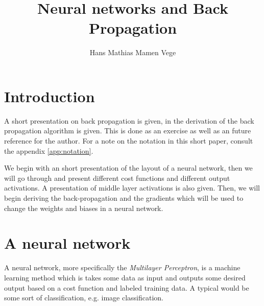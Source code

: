 \documentclass[a4paper,10pt]{article}
\title{Neural networks and Back Propagation}
\author{Hans Mathias Mamen Vege}
\begin{document}
\maketitle

\section{Introduction}
A short presentation on back propagation is given, in the derivation of the back propagation algorithm is given. This is done as an exercise as well as an future reference for the author. For a note on the notation in this short paper, consult the appendix \ref{app:notation}.

We begin with an short presentation of the layout of a neural network, then we will go through and present different cost functions and different output activations. A presentation of middle layer activations is also given. Then, we will begin deriving the back-propagation and the gradients which will be used to change the weights and biases in a neural network.

\section{A neural network}
A neural network, more specifically the \textit{Multilayer Perceptron}, is a machine learning method which is takes some data as input and outputs some desired output based on a cost function and labeled training data. A typical would be some sort of classification, e.g. image classification.
\end{document}
